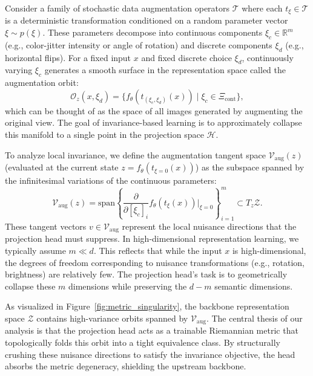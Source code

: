 \documentclass{article}
\theoremstyle{plain}
\theoremstyle{definition}
\theoremstyle{remark}
\begin{document}
Consider a family of stochastic data augmentation operators $\mathcal{T}$ where each $t_\xi \in \mathcal{T}$ is a deterministic transformation conditioned on a random parameter vector $\xi \sim p(\xi)$. These parameters decompose into continuous components $\xi_c \in \mathbb{R}^m$ (e.g., color-jitter intensity or angle of rotation) and discrete components $\xi_d$ (e.g., horizontal flips). For a fixed input $x$ and fixed discrete choice $\xi_d$, continuously varying $\xi_c$ generates a smooth surface in the representation space called the augmentation orbit:
\begin{equation*}
    \mathcal{O}_z(x, \xi_d) = \{ f_\theta(t_{(\xi_c, \xi_d)}(x)) \mid \xi_c \in \Xi_{\text{cont}} \},
\end{equation*}
which can be thought of as the space of all images generated by augmenting the original view. The goal of invariance-based learning is to approximately collapse this manifold to a single point in the projection space $\mathcal{H}$.

To analyze local invariance, we define the augmentation tangent space $\mathcal{V}_{\text{aug}}(z)$ (evaluated at the current state $z = f_\theta(t_{\xi=0}(x))$) as the subspace spanned by the infinitesimal variations of the continuous parameters:
\begin{equation*}
    \mathcal{V}_{\text{aug}}(z) = \text{span}\left\{ \frac{\partial}{\partial [\xi_c]_i} f_\theta(t_\xi(x)) \bigg|_{\xi=0} \right\}_{i=1}^m \subset T_z \mathcal{Z}.
\end{equation*}
These tangent vectors $v \in \mathcal{V}_{\text{aug}}$ represent the local nuisance directions that the projection head must suppress. In high-dimensional representation learning, we typically assume $m \ll d$. This reflects that while the input $x$ is high-dimensional, the degrees of freedom corresponding to nuisance transformations (e.g., rotation, brightness) are relatively few. The projection head's task is to geometrically collapse these $m$ dimensions while preserving the $d - m$ semantic dimensions.

As visualized in Figure~\ref{fig:metric_singularity}, the backbone representation space $\mathcal{Z}$ contains high-variance orbits spanned by $\mathcal{V}_{\text{aug}}$. The central thesis of our analysis is that the projection head acts as a trainable Riemannian metric that topologically folds this orbit into a tight equivalence class. By structurally crushing these nuisance directions to satisfy the invariance objective, the head absorbs the metric degeneracy, shielding the upstream backbone.
\end{document}

